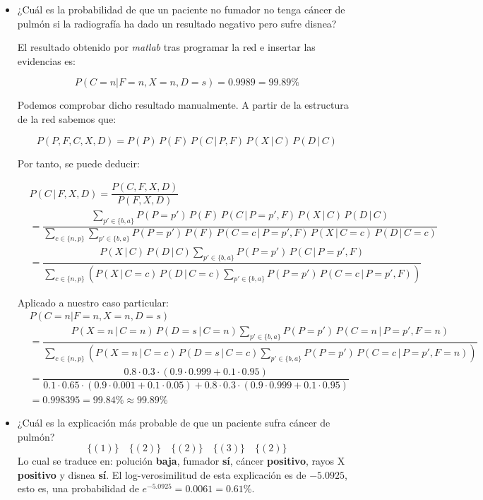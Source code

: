 \documentclass[a4paper]{article}
\begin{document}
\begin{itemize} 
\item ¿Cuál es la probabilidad de que un paciente no fumador no tenga cáncer de pulmón si la radiografía ha dado un resultado negativo pero sufre disnea?

El resultado obtenido por \textit{matlab} tras programar la red e insertar las evidencias es:

\[ P \left( C = n | F = n, X = n, D = s \right) = 0.9989 = 99.89\% \]

Podemos comprobar dicho resultado manualmente. A partir de la estructura de la red sabemos que:

\[ P(P, F, C, X, D) = P(P)\,P(F)\,P(C\,|\,P,F)\,P(X\,|\,C)\,P(D\,|\,C) \]

Por tanto, se puede deducir:

{\small \[ \begin{aligned}
&P(C\,|\,F,X,D) = \dfrac{P(C,F,X,D)}{P(F,X,D)} \\
&=\dfrac{ \sum\limits_{p\prime \in \lbrace b, a \rbrace} P(P=p\prime )\,P(F)\,P(C\,|\,P=p\prime ,F)\,P(X\,|\,C)\,P(D\,|\,C)}{ \sum\limits_{c \in \lbrace n, p \rbrace} \sum\limits_{p\prime \in \lbrace b, a \rbrace} P(P=p\prime )\,P(F)\,P(C=c\,|\,P=p\prime ,F)\,P(X\,|\,C=c)\,P(D\,|\,C=c)} \\
&= \dfrac{ P(X\,|\,C)\,P(D\,|\,C) \sum\limits_{p\prime \in \lbrace b, a \rbrace} P(P=p\prime )\,P(C\,|\,P=p\prime ,F)}{ \sum\limits_{c \in \lbrace n, p \rbrace} \left( P(X\,|\,C=c)\,P(D\,|\,C=c) \sum\limits_{p\prime \in \lbrace b, a \rbrace} P(P=p\prime )\,P(C=c\,|\,P=p\prime ,F) \right) } \end{aligned}  \]}

Aplicado a nuestro caso particular:
{\small \[ \begin{aligned}
&P \left( C = n | F = n, X = n, D = s \right) \\
&=\dfrac{ P(X=n\,|\,C=n)\,P(D=s\,|\,C=n) \sum\limits_{p\prime \in \lbrace b, a \rbrace} P(P=p\prime )\,P(C=n\,|\,P=p\prime ,F=n)}{ \sum\limits_{c \in \lbrace n, p \rbrace} \left( P(X=n\,|\,C=c)\,P(D=s\,|\,C=c) \sum\limits_{p\prime \in \lbrace b, a \rbrace} P(P=p\prime )\,P(C=c\,|\,P=p\prime ,F=n) \right) } \\
&= \dfrac{0.8 \cdot 0.3 \cdot (0.9 \cdot 0.999+0.1 \cdot 0.95)} {0.1 \cdot 0.65 \cdot (0.9 \cdot 0.001 + 0.1 \cdot 0.05) + 0.8 \cdot 0.3 \cdot (0.9 \cdot 0.999+0.1 \cdot 0.95) } \\
&= 0.998395 = 99.84\% \approx 99.89 \% \end{aligned} \]}



\item ¿Cuál es la explicación más probable de que un paciente sufra cáncer de pulmón?
\[ \lbrace \left( 1 \right) \rbrace \quad \lbrace \left( 2 \right) \rbrace \quad \lbrace \left( 2 \right) \rbrace \quad \lbrace \left( 3 \right) \rbrace \quad \lbrace \left( 2 \right) \rbrace \]
Lo cual se traduce en: polución \textbf{baja}, fumador \textbf{sí}, cáncer \textbf{positivo}, rayos X \textbf{positivo} y disnea \textbf{sí}. El log-verosimilitud de esta explicación es de $-5.0925$, esto es, una probabilidad de $e^{-5.0925}=0.0061=0.61\%$.
\end{itemize}
\end{document}
